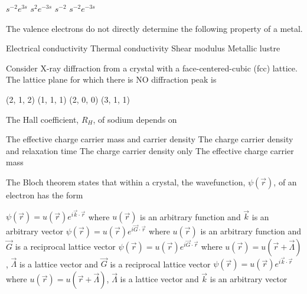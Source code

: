 \documentclass{exam}
\begin{document}
\begin{questions}
\begin{oneparchoices}
	\choice $s^{-2}e^{3s}$ \choice $s^{2}e^{-3s}$ \choice $s^{-2}$ \choice $s^{-2}e^{-3s}$
\end{oneparchoices}

\question The valence electrons do not directly determine the following property of a metal.\hfill{}

\begin{choices}
\begin{multicols}{2}
\choice Electrical conductivity
\choice Thermal conductivity
\choice Shear modulus
\choice Metallic lustre
\end{multicols}
\end{choices}

\question Consider X-ray diffraction from a crystal with a face-centered-cubic (fcc) lattice. The lattice plane for which there is NO diffraction peak is\hfill{}

\begin{oneparchoices}
	\choice (2, 1, 2) \choice (1, 1, 1) \choice (2, 0, 0) \choice (3, 1, 1)
\end{oneparchoices}

\question The Hall coefficient, $R_H$, of sodium depends on\hfill{}

\begin{choices}
\choice The effective charge carrier mass and carrier density
\choice The charge carrier density and relaxation time
\choice The charge carrier density only
\choice The effective charge carrier mass
\end{choices}

\question The Bloch theorem states that within a crystal, the wavefunction, $\psi(\vec{r})$, of an electron has the form\hfill{}

\begin{choices}
	\choice $\psi(\vec{r})=u(\vec{r})e^{i\vec{k}\cdot\vec{r}}$ where $u(\vec{r})$ is an arbitrary function and $\vec{k}$ is an arbitrary vector
	\choice $\psi(\vec{r})=u(\vec{r})e^{i\vec{G}\cdot\vec{r}}$ where $u(\vec{r})$ is an arbitrary function and $\vec{G}$ is a reciprocal lattice vector
	\choice $\psi(\vec{r})=u(\vec{r})e^{i\vec{G}\cdot\vec{r}}$ where $u(\vec{r})=u(\vec{r}+\vec{\Lambda})$, $\vec{\Lambda}$ is a lattice vector and $\vec{G}$ is a reciprocal lattice vector
	\choice $\psi(\vec{r})=u(\vec{r})e^{i\vec{k}\cdot\vec{r}}$ where $u(\vec{r})=u(\vec{r}+\vec{\Lambda})$, $\vec{\Lambda}$ is a lattice vector and $\vec{k}$ is an arbitrary vector
\end{choices}


\end{questions}
\end{document}
